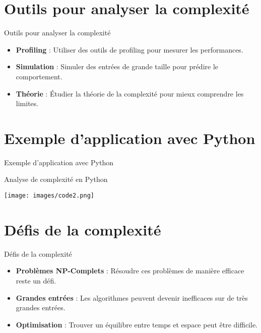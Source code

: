\documentclass{clbeamer2024}
\begin{document}
\section{Outils pour analyser la complexité}
\begin{frame}{Outils pour analyser la complexité}
	\begin{itemize}
		\item \textbf{Profiling} : Utiliser des outils de profiling pour mesurer les performances.
		\item \textbf{Simulation} : Simuler des entrées de grande taille pour prédire le comportement.
		\item \textbf{Théorie} : Étudier la théorie de la complexité pour mieux comprendre les limites.
	\end{itemize}
\end{frame}


\section{Exemple d'application avec Python}
\begin{frame}{Exemple d'application avec Python}
	\begin{exampleblock}{Analyse de complexité en Python}
		
		\begin{center}
			\texttt{[image: images/code2.png]}
		\end{center}
		
	\end{exampleblock}
\end{frame}


\section{Défis de la complexité}
\begin{frame}{Défis de la complexité}
	\begin{itemize}
		\item \textbf{Problèmes NP-Complets} : Résoudre ces problèmes de manière efficace reste un défi.
		\item \textbf{Grandes entrées} : Les algorithmes peuvent devenir inefficaces sur de très grandes entrées.
		\item \textbf{Optimisation} : Trouver un équilibre entre temps et espace peut être difficile.
	\end{itemize}
\end{frame}
\end{document}
